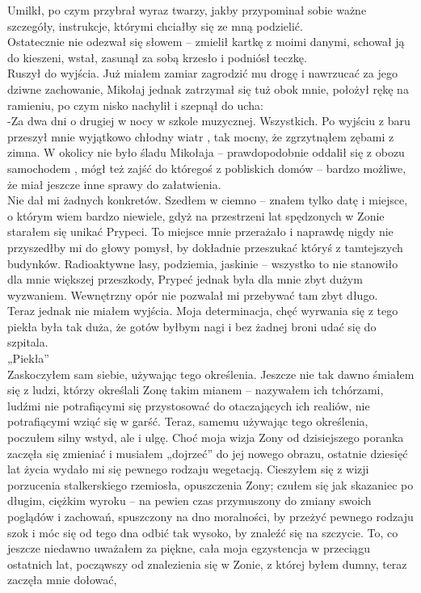 \documentclass[../MAIN.tex]{subfiles}
\begin{document}
Umilkł, po czym przybrał wyraz twarzy, jakby przypominał sobie ważne szczegóły, instrukcje, którymi chciałby się ze mną podzielić.\\
Ostatecznie nie odezwał się słowem -- zmielił kartkę z moimi danymi, schował ją do kieszeni, wstał, zasunął za sobą krzesło i podniósł teczkę.\\
Ruszył do wyjścia. Już miałem zamiar zagrodzić mu drogę i nawrzucać za jego dziwne zachowanie, Mikołaj jednak zatrzymał się tuż obok mnie, położył rękę na ramieniu, po czym nisko nachylił i szepnął do ucha:\\
-Za dwa dni o drugiej w nocy w szkole muzycznej. Wszystkich.
% 
%
Po wyjściu z baru przeszył mnie wyjątkowo chłodny wiatr , tak mocny, że zgrzytnąłem zębami z zimna. W okolicy nie było śladu Mikołaja -- prawdopodobnie oddalił się z obozu samochodem , mógł też zajść do któregoś z pobliskich domów -- bardzo możliwe, że miał jeszcze inne sprawy do załatwienia.\\
Nie dał mi żadnych konkretów. Szedłem w ciemno -- znałem tylko datę i miejsce, o którym wiem bardzo niewiele, gdyż na przestrzeni lat spędzonych w Zonie starałem się unikać Prypeci. To miejsce mnie przerażało i naprawdę nigdy nie przyszedłby mi do głowy pomysł, by dokładnie przeszukać któryś z tamtejszych budynków. Radioaktywne lasy, podziemia, jaskinie -- wszystko to nie stanowiło dla mnie większej przeszkody, Prypeć jednak była dla mnie zbyt dużym wyzwaniem. Wewnętrzny opór nie pozwalał mi przebywać tam zbyt długo.\\
Teraz jednak nie miałem wyjścia. Moja determinacja, chęć wyrwania się z tego piekła była tak duża, że gotów byłbym nagi i bez żadnej broni udać się do szpitala.\\
„Piekła”\\
Zaskoczyłem sam siebie, używając tego określenia. Jeszcze nie tak dawno śmiałem się z ludzi, którzy określali Zonę takim mianem -- nazywałem ich tchórzami, ludźmi nie potrafiącymi się przystosować do otaczających ich realiów, nie potrafiącymi wziąć się w garść. Teraz, samemu używając tego określenia, poczułem silny wstyd, ale i ulgę. Choć moja wizja Zony od dzisiejszego poranka zaczęła się zmieniać i musiałem „dojrzeć” do jej nowego obrazu, ostatnie dziesięć lat życia wydało mi się pewnego rodzaju wegetacją. Cieszyłem się z wizji porzucenia stalkerskiego rzemiosła, opuszczenia Zony; czułem się jak skazaniec po długim, ciężkim wyroku -- na pewien czas przymuszony do zmiany swoich poglądów i zachowań, spuszczony na dno moralności, by przeżyć pewnego rodzaju szok i móc się od tego dna odbić tak wysoko, by znaleźć się na szczycie. To, co jeszcze niedawno uważałem za piękne, cała moja egzystencja w przeciągu ostatnich lat, począwszy od znalezienia się w Zonie, z której byłem dumny, teraz zaczęła mnie dołować, 
\end{document}

